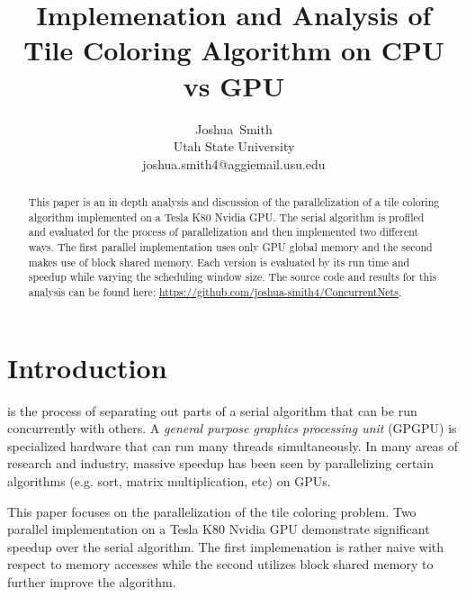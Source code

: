 \documentclass[journal]{IEEEtran}
\begin{document}
\title{Implemenation and Analysis of Tile Coloring Algorithm on CPU vs GPU}

\author{Joshua~Smith\\
        Utah State University\\
        joshua.smith4@aggiemail.usu.edu}


\maketitle

\begin{abstract}
This paper is an in depth analysis and discussion of the parallelization of a tile coloring algorithm implemented on a Tesla K80 Nvidia GPU. The serial algorithm is profiled and evaluated for the process of parallelization and then implemented two different ways. The first parallel implementation uses only GPU global memory and the second makes use of block shared memory. Each version is evaluated by its run time and speedup while varying the scheduling window size. The source code and results for this analysis can be found here: \url{https://github.com/joshua-smith4/ConcurrentNets}.
\end{abstract}

\IEEEpeerreviewmaketitle

\section{Introduction}

 is the process of separating out parts of a serial algorithm that can be run concurrently with others. A \emph{general purpose graphics processing unit} (GPGPU) is specialized hardware that can run many threads simultaneously. In many areas of research and industry, massive speedup has been seen by parallelizing certain algorithms (e.g. sort, matrix multiplication, etc) on GPUs.

This paper focuses on the parallelization of the tile coloring problem. Two parallel implementation on a Tesla K80 Nvidia GPU demonstrate significant speedup over the serial algorithm. The first implemenation is rather naive with respect to memory accesses while the second utilizes block shared memory to further improve the algorithm.
\end{document}
